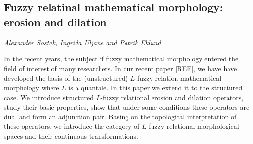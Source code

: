 \documentclass[../booklet.tex]{subfiles}
\begin{document}
\subsection[Fuzzy relatinal mathematical morphology: erosion and dilation. {\it Alexander Sostak, Ingrida Uljane and Patrik Eklund}]{Fuzzy relatinal mathematical morphology: erosion and dilation}
  

\begin{center}
  {\it Alexander Sostak, Ingrida Uljane and Patrik Eklund}
\end{center}

\vskip 0.8cm

 In the recent years, the subject if fuzzy mathematical morphology entered the field of interest of many researchers. In our recent paper [REF], we have have developed the basis of the (unstructured) $L$-fuzzy relation mathematical morphology where $L$ is a quantale. In this paper we extend  it to the structured case. We introduce structured $L$-fuzzy relational erosion and dilation operators, study their basic properties, show that under some conditions  these operators are dual and form an adjunction pair. Basing on the topological interpretation of these operators, we introduce the category of  $L$-fuzzy relational morphological spaces and their continuous transformations. 


\end{document}
